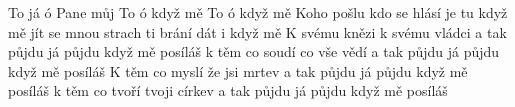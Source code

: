 \begin{TEXT}{To já ó Pane můj}
\REFREN   To  ó    když mě  \NL
To  ó    když mě 
\SLOKA Koho pošlu kdo se hlásí je tu   \NL
{} když mě  \NL
{} jít se mnou strach ti brání dát i   \NL
{} když mě  
\SLOKA K svému knězi k svému vládci a tak půjdu já \NL
půjdu když mě posíláš \NL
k těm co soudí co vše vědí a tak půjdu já \NL
půjdu když mě posíláš 
\SLOKA K těm co myslí že jsi mrtev a tak půjdu já \NL
půjdu když mě posíláš \NL
k těm co tvoří tvoji církev a tak půjdu já \NL
půjdu když mě posíláš \NL
\end{TEXT}
